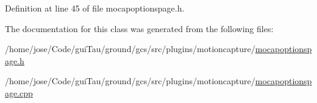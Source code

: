 Definition at line 45 of file mocapoptionspage.\-h.



The documentation for this class was generated from the following files\-:\begin{DoxyCompactItemize}
\item 
/home/jose/\-Code/gui\-Tau/ground/gcs/src/plugins/motioncapture/\hyperlink{mocapoptionspage_8h}{mocapoptionspage.\-h}\item 
/home/jose/\-Code/gui\-Tau/ground/gcs/src/plugins/motioncapture/\hyperlink{mocapoptionspage_8cpp}{mocapoptionspage.\-cpp}\end{DoxyCompactItemize}
